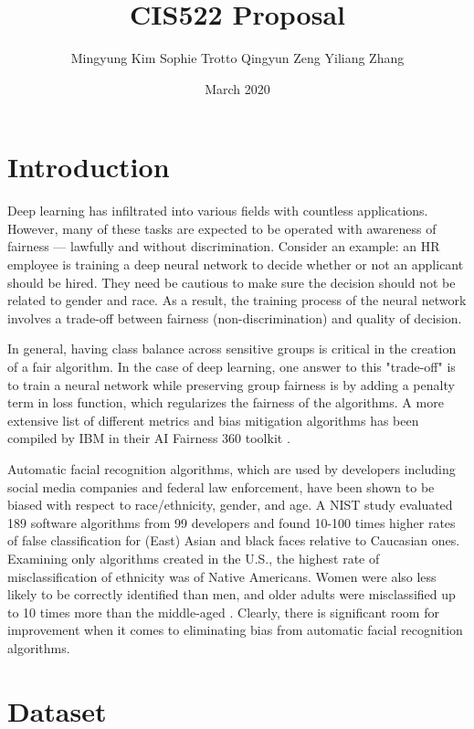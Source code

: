 \documentclass{article}
\title{CIS522 Proposal}
\author{Mingyung Kim \quad Sophie Trotto \quad Qingyun Zeng \quad Yiliang Zhang}
\date{March 2020}
\begin{document}
\maketitle

\section{Introduction}

Deep learning has infiltrated into various fields with countless applications. However, many of these tasks are expected to be operated with awareness of fairness — lawfully and without discrimination. Consider an example: an HR employee is training a deep neural network to decide whether or not an applicant should be hired. They need be cautious to make sure the decision should not be related to gender and race. As a result, the training process of the neural network involves a trade-off between fairness (non-discrimination) and quality of decision.

In general, having class balance across sensitive groups is critical in the creation of a fair algorithm. In the case of deep learning, one answer to this "trade-off" is to train a neural network while preserving group fairness is by adding a penalty term in loss function, which regularizes the fairness of the algorithms. A more extensive list of different metrics and bias mitigation algorithms has been compiled by IBM in their AI Fairness 360 toolkit \cite{aif360-oct-2018}.

Automatic facial recognition algorithms, which are used by developers including social media companies and federal law enforcement, have been shown to be biased with respect to race/ethnicity, gender, and age. A NIST study evaluated 189 software algorithms from 99 developers and found 10-100 times higher rates of false classification for (East) Asian and black faces relative to Caucasian ones. Examining only algorithms created in the U.S., the highest rate of misclassification of ethnicity was of Native Americans. Women were also less likely to be correctly identified than men, and older adults were misclassified up to 10 times more than the middle-aged  \cite{grother2019face}. Clearly, there is significant room for improvement when it comes to eliminating bias from automatic facial recognition algorithms. 

\section{Dataset}
\end{document}
